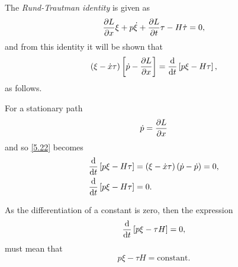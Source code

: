 \begin{comment}
Firstly, for the purposes of part (d) (at least the first part of it), it's not the case that both sides are equal to 0. You have to prove that the identity holds for all paths, not just stationary paths. In other words, you cannot use that p-dot = dL/dx, until the very last bit of (d), when you do assume a stationary path. But the original identity must be proved without that. I'd recommend starting from the right hand side and (using the Rund-Trautman identity), show it equals the left.
\end{comment}
The \textit{Rund-Trautman identity} is given as
\begin{equation}
	\label{eq:5.3}
	\frac{\partial L}{\partial x}\xi +p\dot{\xi} +\frac{\partial L}{\partial t}\tau - H\dot{\tau}=0,
\end{equation}
and from this identity it will be shown that 
\begin{equation}
	\label{eq:5.4}
	\left(\xi-\dot{x}\tau\right)\left[\dot{p}-\frac{\partial L}{\partial x}\right] = \frac{\mathrm{d}}{\mathrm{d}t}\left[p\xi-H\tau\right],
\end{equation}
as follows.


For a stationary path 
\[
	\dot{p} = \frac{\partial L}{\partial x}
\]
and so \eqref{5.22} becomes
\begin{align}
	\frac{\mathrm{d}}{\mathrm{d}t}\left[p\xi-H\tau\right]&=  \left(\xi- \dot{x}\tau\right)\left(\dot{p} -\dot{p}\right) = 0,\\
	\frac{\mathrm{d}}{\mathrm{d}t}\left[p\xi-H\tau\right]&= 0.
\end{align}

As the differentiation of a constant is zero, then the expression 
\[
	\frac{\mathrm{d}}{\mathrm{d}t}\left[p\xi - \tau H\right] = 0,
\]
must mean that 
\[
	\boxed{p\xi - \tau H = \text{constant}}.
\]